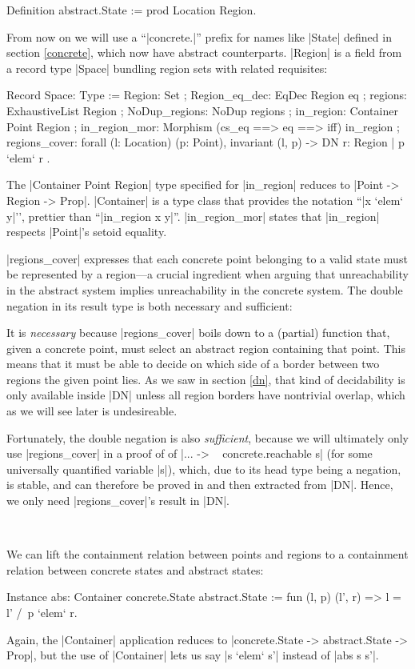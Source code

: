\documentclass[runningheads]{llncs}
\begin{document}
\begin{code}
  Definition abstract.State := prod Location Region.
\end{code}
From now on we will use a ``|concrete.|'' prefix for names like |State| defined in section \ref{concrete}, which now have abstract counterparts. |Region| is a field from a record type |Space| bundling region sets with related requisites:
\begin{code}
  Record Space: Type :=
    { Region: Set
    ; Region_eq_dec: EqDec Region eq
    ; regions: ExhaustiveList Region
    ; NoDup_regions: NoDup regions
    ; in_region: Container Point Region
    ; in_region_mor: Morphism (cs_eq ==> eq ==> iff) in_region
    ; regions_cover: forall (l: Location) (p: Point),
        invariant (l, p) -> DN { r: Region | p `elem` r }
    }.
\end{code}
The |Container Point Region| type specified for |in_region| reduces to |Point -> Region -> Prop|. |Container| is a type class that provides the notation ``|x `elem` y|'', prettier than ``|in_region x y|''. |in_region_mor| states that |in_region| respects |Point|'s setoid equality.

|regions_cover| expresses that each concrete point belonging to a valid state must be represented by a region---a crucial ingredient when arguing that unreachability in the abstract system implies unreachability in the concrete system. The double negation in its result type is both necessary and sufficient:

It is \emph{necessary} because |regions_cover| boils down to a (partial) function that, given a concrete point, must select an abstract region containing that point. This means that it must be able to decide on which side of a border between two regions the given point lies. As we saw in section \ref{dn}, that kind of decidability is only available inside |DN| unless all region borders have nontrivial overlap, which as we will see later is undesireable.

Fortunately, the double negation is also \emph{sufficient}, because we will ultimately only use |regions_cover| in a proof of of |... -> ~ concrete.reachable s| (for some universally quantified variable |s|), which, due to its head type being a negation, is stable, and can therefore be proved in and then extracted from |DN|. Hence, we only need |regions_cover|'s result in |DN|.

\

We can lift the containment relation between points and regions to a containment relation between concrete states and abstract states:
\begin{code}
  Instance abs: Container concrete.State abstract.State
    := fun (l, p) (l', r) => l = l' /\ p `elem` r.
\end{code}
Again, the |Container| application reduces to |concrete.State -> abstract.State -> Prop|, but the use of |Container| lets us say |s `elem` s'| instead of |abs s s'|. 
\end{document}
